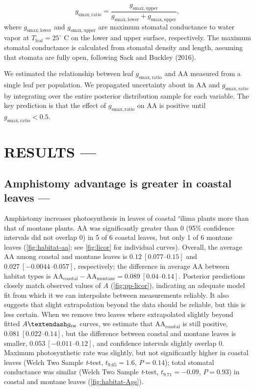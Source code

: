 \documentclass[
  letterpaper,
  DIV=11,
  numbers=noendperiod]{scrartcl}
\begin{document}
\[g_\mathrm{smax,ratio} = \frac{g_\mathrm{smax,upper}}{g_\mathrm{smax,lower} + g_\mathrm{smax,upper}},\]
where \(g_\mathrm{smax,lower}\) and \(g_\mathrm{smax,upper}\) are
maximum stomatal conductance to water vapor at
\(T_\mathrm{leaf} = 25 ^ \circ\) C on the lower and upper surface,
respectively. The maximum stomatal conductance is calculated from
stomatal density and length, assuming that stomata are fully open,
following Sack and Buckley (2016).

We estimated the relationship between leaf \(g_\mathrm{smax,ratio}\) and
\(\mathrm{AA}\) measured from a single leaf per population. We
propagated uncertainty about in \(\mathrm{AA}\) and
\(g_\mathrm{smax,ratio}\) by integrating over the entire posterior
distribution sample for each variable. The key prediction is that the
effect of \(g_\mathrm{smax,ratio}\) on \(\mathrm{AA}\) is positive until
\(g_\mathrm{smax,ratio} < 0.5\).

\hypertarget{results}{%
\section{RESULTS ---}\label{results}}

\hypertarget{amphistomy-advantage-is-greater-in-coastal-leaves}{%
\subsection{Amphistomy advantage is greater in coastal leaves
---}\label{amphistomy-advantage-is-greater-in-coastal-leaves}}

Amphistomy increases photosynthesis in leaves of coastal ʻilima plants
more than that of montane plants. \(\mathrm{AA}\) was significantly
greater than 0 (95\% confidence intervals did not overlap 0) in 5 of 6
coastal leaves, but only 1 of 6 montane leaves
(\autoref{fig:habitat-aa}; see \autoref{fig:licor} for individual
curves). Overall, the average \(\mathrm{AA}\) among coastal and montane
leaves is \(0.12~[\numrange{0.077}{0.15}]\) and
\(0.027~[\numrange{-0.0044}{0.057}]\), respectively; the difference in
average \(\mathrm{AA}\) between habitat types is
\(\mathrm{AA}_\text{coastal} - \mathrm{AA}_\text{montane} = 0.089~[\numrange{0.04}{0.14}]\).
Posterior predictions closely match observed values of \(A\)
(\autoref{fig:pp-licor}), indicating an adequate model fit from which it
we can interpolate between measurements reliably. It also suggests that
slight extrapolation beyond the data should be reliable, but this is
less certain. When we remove two leaves where extrapolated slightly
beyond fitted \(A \textendash g_\mathrm{sw}\) curves, we estimate that
\(\mathrm{AA}_\text{coastal}\) is still positive,
\(0.081~[\numrange{0.022}{0.14}]\), but the difference between coastal
and montane leaves is smaller, \(0.053~[\numrange{-0.011}{0.12}]\), and
confidence intervals slightly overlap 0. Maximum photosynthetic rate was
slightly, but not significantly higher in coastal leaves (Welch Two
Sample \emph{t}-test, \(t_{9.65} = 1.6\), \(P = 0.14\)); total stomatal
conductance was similar (Welch Two Sample \emph{t}-test,
\(t_{9.71} = -0.09\), \(P = 0.93\)) in coastal and montane leaves
(\autoref{fig:habitat-Ags}).
\end{document}
